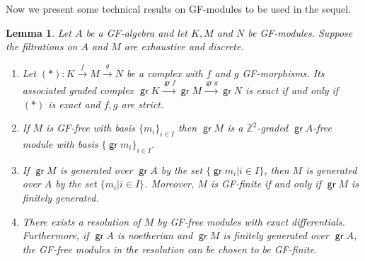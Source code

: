 \documentclass[11pt,fleqn]{article}
\theoremstyle{plain}
\newtheorem{Lemma}[Theorem]{Lemma}
\theoremstyle{remark}
\theoremstyle{definition}
\newcommand\ZZ{\mathbb Z}
\renewcommand\to{\longrightarrow}
\DeclareMathOperator\gr{\mathsf{gr}}
\begin{document}
Now we present some technical results on GF-modules to be used in the sequel.
\begin{Lemma}
\label{filtered-complex}
Let $A$ be a GF-algebra and let $K, M$ and $N$ be GF-modules. Suppose the filtrations
on $A$ and $M$ are exhaustive and discrete. 
\begin{enumerate}
	\item Let $(*): K \stackrel{f}{\to} M \stackrel{g}{\to} N$ be a complex with $f$ and
	$g$ GF-morphisms. Its associated graded complex $\gr K \stackrel{\gr f}{\to} \gr
	M \stackrel{\gr g}{\to} \gr N$ is exact if and only if $(*)$ is exact and
	$f, g$ are strict.

	\item If $M$ is GF-free with basis $\{m_i\}_{i \in I}$ then $\gr M$ is a 
	$\ZZ^2$-graded $\gr A$-free module with basis $\{\gr m_i\}_{i \in I}$.

	\item If $\gr M$ is generated over $\gr A$ by the set $\{\gr m_i|i \in
	I\}$, then $M$ is generated over $A$ by the set $\{m_i|i \in I\}$. 
	Moreover, $M$ is GF-finite if and only if $\gr M$ is finitely generated.

	\item There exists a resolution of $M$ by GF-free modules with exact
	differentials. Furthermore, if $\gr A$ is noetherian and $\gr M$ is
	finitely generated over $\gr A$, the GF-free modules in the resolution can
	be chosen to be GF-finite.
\end{enumerate}
\end{Lemma}
\end{document}
